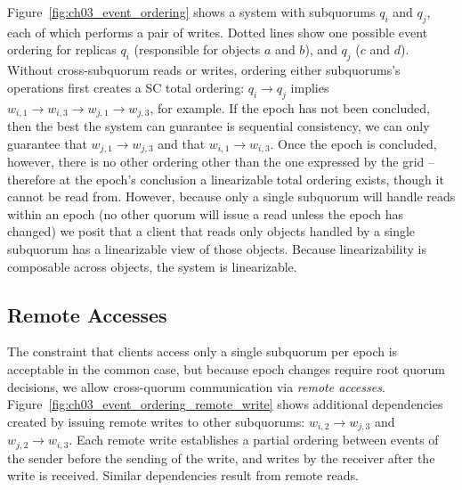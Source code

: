 Figure~\ref{fig:ch03_event_ordering} shows a system with subquorums $q_i$ and $q_j$, each of which performs a pair of writes.
Dotted lines show one possible event ordering for replicas $q_i$ (responsible for objects $a$ and $b$), and $q_j$ ($c$ and $d$).
Without cross-subquorum reads or writes, ordering either subquorums's operations first creates a SC total ordering: $q_i \rightarrow q_j$ implies $w_{i,1} \rightarrow w_{i,3} \rightarrow w_{j,1} \rightarrow w_{j,3}$, for example.
If the epoch has not been concluded, then the best the system can guarantee is sequential consistency, we can only guarantee that $w_{j,1} \rightarrow w_{j,3}$ and that $w_{i,1} \rightarrow w_{i,3}$.
Once the epoch is concluded, however, there is no other ordering other than the one expressed by the grid -- therefore at the epoch's conclusion a linearizable total ordering exists, though it cannot be read from.
However, because only a single subquorum will handle reads within an epoch (no other quorum will issue a read unless the epoch has changed) we posit that a client that reads only objects handled by a single subquorum has a linearizable view of those objects.
Because linearizability is composable across objects, the system is linearizable.

\subsection{Remote Accesses}
\label{ch03_remote_accesses}

The constraint that clients access only a single subquorum per epoch is acceptable in the common case, but because epoch changes require root quorum decisions, we allow cross-quorum communication via \emph{remote accesses}.
Figure~\ref{fig:ch03_event_ordering_remote_write} shows additional dependencies created by issuing remote writes to other subquorums: $w_{i,2} \rightarrow w_{j,3}$ and $w_{j,2} \rightarrow w_{i,3}$.
Each remote write establishes a partial ordering between events of the sender before the sending of the write, and writes by the receiver after the write is received.
Similar dependencies result from remote reads.


